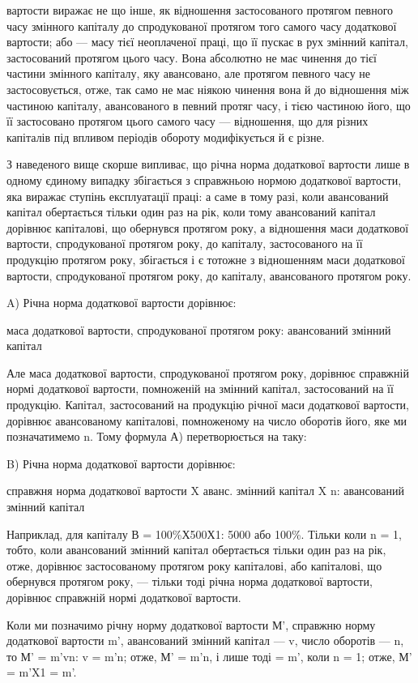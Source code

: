\parcont{}  %
вартости виражає не що інше, як відношення застосованого протягом
певного часу змінного капіталу до спродукованої протягом того самого
часу додаткової вартости; або — масу тієї неоплаченої праці, що її пускає
в рух змінний капітал, застосований протягом цього часу. Вона абсолютно
не має чинення до тієї частини змінного капіталу, яку авансовано,
але протягом певного часу не застосовується, отже, так само не
має ніякою чинення вона й до відношення між частиною капіталу, авансованого
в певний протяг часу, і тією частиною його, що її застосовано
протягом цього самого часу — відношення, що для різних капіталів
під впливом періодів обороту модифікується й є різне.

З наведеного вище скорше випливає, що річна норма додаткової вартости
лише в одному єдиному випадку збігається з справжньою нормою
додаткової вартости, яка виражає ступінь експлуатації праці: а саме в
тому разі, коли авансований капітал обертається тільки один раз на рік,
коли тому авансований капітал дорівнює капіталові, що обернувся протягом
року, а відношення маси додаткової вартости, спродукованої протягом
року, до капіталу, застосованого на її продукцію протягом року, збігається
і є тотожне з відношенням маси додаткової вартости, спродукованої
протягом року, до капіталу, авансованого протягом року.

A) Річна норма додаткової вартости дорівнює:

маса додаткової вартости, спродукованої протягом року: авансований змінний капітал

Але маса додаткової вартости, спродукованої протягом року, дорівнює
справжній нормі додаткової вартости, помноженій на змінний капітал,
застосований на її продукцію. Капітал, застосований на продукцію
річної маси додаткової вартости, дорівнює авансованому капіталові, помноженому
на число оборотів його, яке ми позначатимемо n. Тому формула А) перетворюється на таку:

B) Річна норма додаткової вартости дорівнює:

справжня норма додаткової вартости X аванс. змінний капітал X n: авансований змінний капітал

Наприклад, для капіталу В = 100\%Х500Х1: 5000 або 100\%. Тільки коли
n = 1, тобто, коли авансований змінний капітал обертається тільки
один раз на рік, отже, дорівнює застосованому протягом року капіталові,
або капіталові, що обернувся протягом року, — тільки тоді річна норма додаткової
вартости, дорівнює справжній нормі додаткової вартости.

Коли ми позначимо річну норму додаткової вартости М', справжню норму
додаткової вартости m', авансований змінний капітал — v, число оборотів
— n, то М' = m'vn: v = m'n; отже, М' = m'n, і лише тоді = m', коли
n = 1; отже, М' = m'X1 = m'.
\parbreak{}  %
